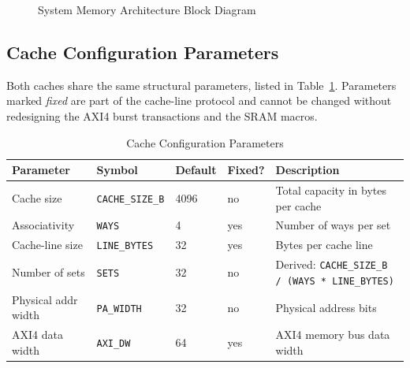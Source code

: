 \begin{figure}[H]
\caption{System Memory Architecture Block Diagram}
\label{fig:asMemArch01}
\end{figure}

\subsection{Cache Configuration Parameters}

Both caches share the same structural parameters, listed in
Table~\ref{tab:asCacheParams}.
Parameters marked \emph{fixed} are part of the cache-line protocol and
cannot be changed without redesigning the AXI4 burst transactions and the
SRAM macros.

\begin{table}[H]
\caption{Cache Configuration Parameters}
\label{tab:asCacheParams}
\centering
\begin{tabularx}{\textwidth}{|l |l |l |l |X|}
  \hline
  Parameter & Symbol & Default & Fixed? & Description \\
  \hline
  \hline
  Cache size          & \texttt{CACHE\_SIZE\_B} & 4096 & no  & Total capacity in bytes per cache \\
  \hline
  Associativity       & \texttt{WAYS}           & 4    & yes & Number of ways per set \\
  \hline
  Cache-line size     & \texttt{LINE\_BYTES}    & 32   & yes & Bytes per cache line \\
  \hline
  Number of sets      & \texttt{SETS}           & 32   & no  & Derived: \texttt{CACHE\_SIZE\_B / (WAYS * LINE\_BYTES)} \\
  \hline
  Physical addr width & \texttt{PA\_WIDTH}      & 32   & no  & Physical address bits \\
  \hline
  AXI4 data width     & \texttt{AXI\_DW}        & 64   & yes & AXI4 memory bus data width \\
  \hline
\end{tabularx}
\end{table}

